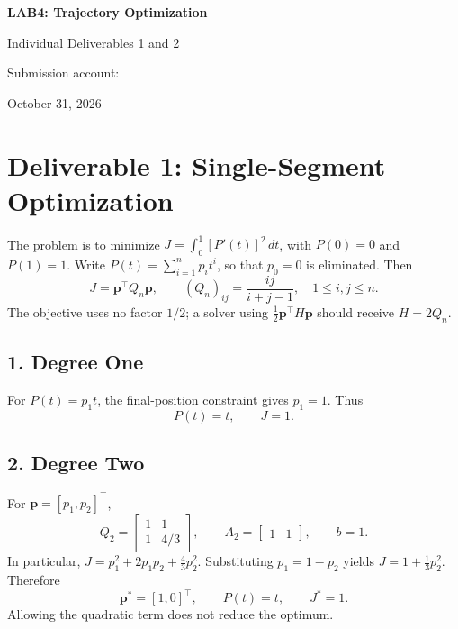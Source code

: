

\begin{center}
{\LARGE\bfseries\color{navy}LAB4: Trajectory Optimization}\par
\vspace{6pt}
{\large Individual Deliverables 1 and 2}\par
\vspace{6pt}
Submission account: \par
October 31, 2026
\end{center}

\section{Deliverable 1: Single-Segment Optimization}
The problem is to minimize $J=\int_0^1[P'(t)]^2\,dt$, with $P(0)=0$ and
$P(1)=1$. Write $P(t)=\sum_{i=1}^n p_i t^i$, so that $p_0=0$ is eliminated.
Then
\begin{equation}
J=\mathbf p^\top Q_n\mathbf p,\qquad
(Q_n)_{ij}=\frac{ij}{i+j-1},\quad 1\leq i,j\leq n.
\end{equation}
The objective uses no factor $1/2$; a solver using
$\frac12\mathbf p^\top H\mathbf p$ should receive $H=2Q_n$.

\subsection{1. Degree One}
For $P(t)=p_1t$, the final-position constraint gives $p_1=1$. Thus
\begin{equation}
\boxed{P(t)=t,\qquad J=1.}
\end{equation}

\subsection{2. Degree Two}
For $\mathbf p=[p_1,p_2]^\top$,
\begin{equation}
Q_2=\begin{bmatrix}1&1\\1&4/3\end{bmatrix},\qquad
A_2=\begin{bmatrix}1&1\end{bmatrix},\qquad b=1.
\end{equation}
In particular, $J=p_1^2+2p_1p_2+\frac43p_2^2$. Substituting
$p_1=1-p_2$ yields $J=1+\frac13p_2^2$. Therefore
\begin{equation}
\boxed{\mathbf p^*=[1,0]^\top,\qquad P(t)=t,\qquad J^*=1.}
\end{equation}
Allowing the quadratic term does not reduce the optimum.

